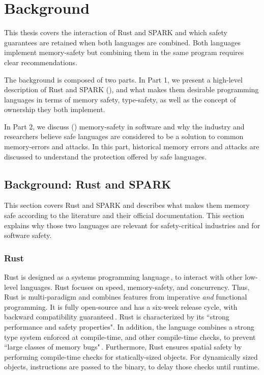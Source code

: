 \documentclass[nomenclature, english, bibtex]{kththesis}
\begin{document}
\cleardoublepage\chapter{Background}
\label{ch:background}

This thesis covers the interaction of Rust and SPARK and which safety guarantees are retained when both languages are combined. Both languages implement \gls{memory-safety} but combining them in the same program requires clear recommendations. 

The background is composed of two parts. 
In Part 1, we present a 
high-level description of Rust and SPARK (), and what makes them desirable programming languages in terms of memory safety, \gls{type-safety}, as well as the concept of \gls{ownership} they both implement.

In Part 2, we discuss () \gls{memory-safety} in software and why the industry and researchers believe safe languages are considered to be a solution to common \gls{memory-error}s and attacks. In this part, historical memory errors and attacks are discussed to understand the protection offered by safe languages. 

\section{Background: Rust and SPARK}
\label{sec:rust_and_spark}

This section covers Rust and SPARK and describes what makes them memory safe according to the literature and their official documentation. This section explains why those two languages are relevant for \gls{safety-critical} industries and for software safety.


\subsection{Rust}

Rust is designed as a systems programming language\,\cite{mergendahl_cross-language_2022}, to interact with other low-level languages. Rust focuses on speed, \gls{memory-safety}, and concurrency. Thus, Rust is multi-paradigm and combines features from imperative \textit{and} functional programming. It is fully open-source and has a six-week release cycle, with backward compatibility guaranteed\,\cite{poveda_ruiz_bounded_2019,noauthor_rust_nodate}. Rust is characterized by its ``strong performance and safety properties". In addition, the language combines a strong type system enforced at compile-time, and other compile-time checks, to prevent ``large classes of memory bugs"\,\cite{mergendahl_cross-language_2022}. Furthermore, Rust ensures spatial safety by performing compile-time checks for statically-sized objects. For dynamically sized objects, instructions are passed to the binary, to delay those checks until runtime.
\end{document}

